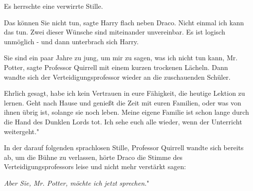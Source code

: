 Es herrschte eine verwirrte Stille.

\glqq Das können Sie nicht tun\grqq{}, sagte Harry flach neben Draco. \glqq
Nicht einmal ich kann das tun. Zwei dieser Wünsche sind miteinander unvereinbar.
Es ist logisch unmöglich -\grqq{} und dann unterbrach sich Harry.

\glqq Sie sind ein paar Jahre zu jung, um mir zu sagen, was ich nicht tun kann,
Mr. Potter\grqq{}, sagte Professor Quirrell mit einem kurzen trockenen Lächeln.
Dann wandte sich der Verteidigungsprofessor wieder an die zuschauenden Schüler.

\glqq Ehrlich gesagt, habe ich kein Vertrauen in eure Fähigkeit, die heutige
Lektion zu lernen. Geht nach Hause und genießt die Zeit mit euren Familien, oder
was von ihnen übrig ist, solange sie noch leben. Meine eigene Familie ist schon
lange durch die Hand des Dunklen Lords tot. Ich sehe euch alle wieder, wenn der
Unterricht weitergeht."

In der darauf folgenden sprachlosen Stille, Professor Quirrell wandte sich
bereits ab, um die Bühne zu verlassen, hörte Draco die Stimme des
Verteidigungsprofessors leise und nicht mehr verstärkt sagen:

\glqq \emph{Aber Sie, Mr. Potter, möchte ich jetzt sprechen.}"


